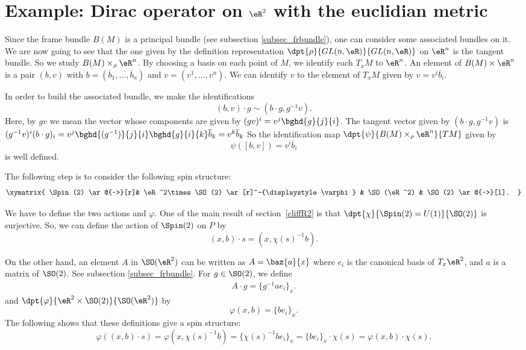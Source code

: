 \section[Dirac operator on  \texorpdfstring{$\eR^2$}{R2}]{Example: Dirac operator on \texorpdfstring{$\eR^2$}{R2} with the euclidian metric}\label{Pg_exempleRdeux}


Since the frame bundle $B(M)$ is a principal bundle (see subsection \ref{subsec_frbundle}), one can consider some associated bundles on it. We are now going to see that the one given by the definition representation $\dpt{\rho}{GL(n,\eR)}{GL(n,\eR)}$ on $\eR^n$ is the tangent bundle. So we study $B(M)\times_{\rho} \eR^n$. By choosing a basis on each point of $M$, we identify each $T_xM$ to $\eR^n$. An element of $B(M)\times \eR^n$ is a pair $(b,v)$ with $b=(\overline{b}_1,\ldots,\overline{b}_n)$ and $v=(v^1,\ldots,v^n)$. We can identify $v$ to the element of $T_xM$ given by $v=v^i\overline{b}_i$.

In order to build the associated bundle, we make the identifications
\[
  (b,v)\cdot g\sim(b\cdot g,g^{-1} v).
\]
Here, by $gv$ we mean the vector whose components are given by $(gv)^i=v^j\bghd{g}{j}{i}$. The tangent vector given by $(b\cdot g,g^{-1} v)$ is $(g^{-1} v)^i(b\cdot g)_i=v^j\bghd{(g^{-1})}{j}{i}\bghd{g}{i}{k}\overline{b}_k=v^k\overline{b}_k$ So the identification map $\dpt{\psi}{B(M)\times_{\rho}\eR^n}{TM}$ given by
\[
  \psi([b,v])=v^i\overline{b}_i
\]
is well defined.

The following step is to consider the following spin structure:
 \[\xymatrix{
    \Spin(2)  \ar@{~>}[r]&  \eR^2\times \SO(2) \ar[r]^-{\displaystyle\varphi} & \SO(\eR^2)  & \SO(2) \ar@{~>}[l].
  }\]

We have to define the two actions and $\varphi$. One of the main result of section~\ref{cliffR2} is that $\dpt{\chi}{\Spin(2)=U(1)}{\SO(2)}$ is surjective. So, we can define the action of $\Spin(2)$ on $P$ by
\[(x,b)\cdot s=(x,\chi(s)^{-1} b).\]

On the other hand, an element $A$ in $\SO(\eR^2)$ can be written as $A=\baz{a}{x}$ where $e_i$ is the canonical basis of $T_x\eR^2$, and $a$ is a matrix of $\SO(2)$. See subsection \ref{subsec_frbundle}. For $g\in \SO(2)$, we define
\begin{eqnarray}
 \label{r1504d2}A\cdot g=\{g^{-1} ae_i\}_x.
\end{eqnarray}
and  $\dpt{\varphi}{\eR^2\times \SO(2)}{\SO(\eR^2)}$ by
\[
\varphi(x,b)=\{be_i\}_x.
\]
The following shows that these definitions give a spin structure:
\begin{equation}
   \varphi((x,b)\cdot s)=\varphi(x,\chi(s)^{-1} b)
                    =\{\chi(s)^{-1} be_i\}_x
                    =\{be_i\}_x\cdot\chi(s)
                    =\varphi(x,b)\cdot\chi(s).
\end{equation}


